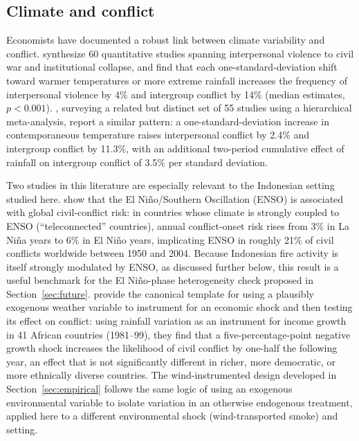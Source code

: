 \documentclass[12pt]{article}
\begin{document}
\subsection{Climate and conflict}

Economists have documented a robust link between climate variability and conflict. \citet{hsiang2013quantifying} synthesize 60 quantitative studies spanning interpersonal violence to civil war and institutional collapse, and find that each one-standard-deviation shift toward warmer temperatures or more extreme rainfall increases the frequency of interpersonal violence by 4\% and intergroup conflict by 14\% (median estimates, $p<0.001$). \citet{burkehsiangmiguel2015}, surveying a related but distinct set of 55 studies using a hierarchical meta-analysis, report a similar pattern: a one-standard-deviation increase in contemporaneous temperature raises interpersonal conflict by 2.4\% and intergroup conflict by 11.3\%, with an additional two-period cumulative effect of rainfall on intergroup conflict of 3.5\% per standard deviation.

Two studies in this literature are especially relevant to the Indonesian setting studied here. \citet{hsiangmengcane2011} show that the El Ni\~{n}o/Southern Oscillation (ENSO) is associated with global civil-conflict risk: in countries whose climate is strongly coupled to ENSO (``teleconnected'' countries), annual conflict-onset risk rises from 3\% in La Ni\~{n}a years to 6\% in El Ni\~{n}o years, implicating ENSO in roughly 21\% of civil conflicts worldwide between 1950 and 2004. Because Indonesian fire activity is itself strongly modulated by ENSO, as discussed further below, this result is a useful benchmark for the El Ni\~{n}o-phase heterogeneity check proposed in Section~\ref{sec:future}. \citet{miguelsatyanathsergenti2004} provide the canonical template for using a plausibly exogenous weather variable to instrument for an economic shock and then testing its effect on conflict: using rainfall variation as an instrument for income growth in 41 African countries (1981--99), they find that a five-percentage-point negative growth shock increases the likelihood of civil conflict by one-half the following year, an effect that is not significantly different in richer, more democratic, or more ethnically diverse countries. The wind-instrumented design developed in Section~\ref{sec:empirical} follows the same logic of using an exogenous environmental variable to isolate variation in an otherwise endogenous treatment, applied here to a different environmental shock (wind-transported smoke) and setting.
\end{document}
